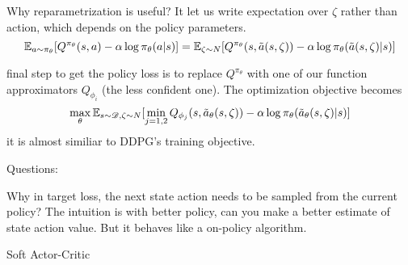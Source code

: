 \documentclass{article}
\begin{document}
Why reparametrization is useful?
It let us write expectation over $\zeta$ rather than action, which 
depends on the policy parameters.
\[
    \mathbb{E}_{a\sim\pi_{\theta}}[Q^{\pi_{\theta}}(s,a) - 
    \alpha\log\pi_{\theta}(a|s)] 
    = \mathbb{E}_{\zeta\sim N}[Q^{\pi_{\theta}}(s, \tilde a(s, \zeta))
    - \alpha\log \pi_{\theta}(\tilde a(s,\zeta)|s)]
\]

final step to get the policy loss is to replace $Q^{\pi_{\theta}}$
with one of our function approximators $Q_{\phi_i}$ (the less confident
one). The optimization objective becomes
\[
    \max_{\theta}\mathbb{E}_{s\sim\mathscr{D},\zeta\sim N}[
        \min_{j=1,2}Q_{\phi_j}(s, \tilde a_{\theta}(s,\zeta))
        - \alpha\log \pi_{\theta}(\tilde a_{\theta}(s,\zeta)|s)
    ]
\]
it is almost similiar to DDPG's training objective. 



Questions:

Why in target loss, the next state action needs to be sampled from the 
current policy? The intuition is with better policy, can you make a 
better estimate of state action value. But it behaves like a on-policy
algorithm.


\begin{algorithm}[H]
\caption{Soft Actor-Critic}
\label{alg}
\end{algorithm}
\end{document}
